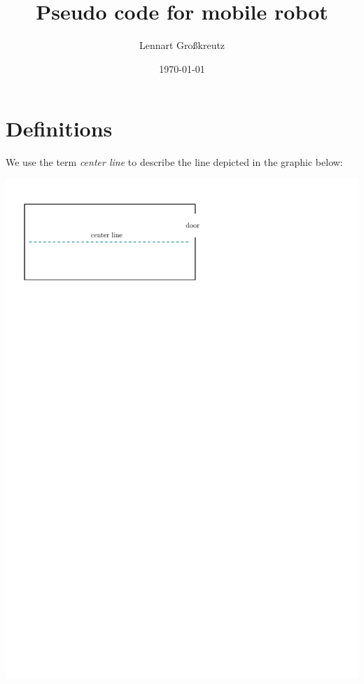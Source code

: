 \documentclass{article}
\title{Pseudo code for mobile robot}
\author{Lennart Großkreutz}
\date{\today}
\begin{document}
\maketitle

\section{Definitions}
We use the term \textit{center line} to describe the line depicted in the graphic below: \\
\hspace{10mm}

\includegraphics[width=.6\textwidth]{images/center-line.pdf}
\end{document}
